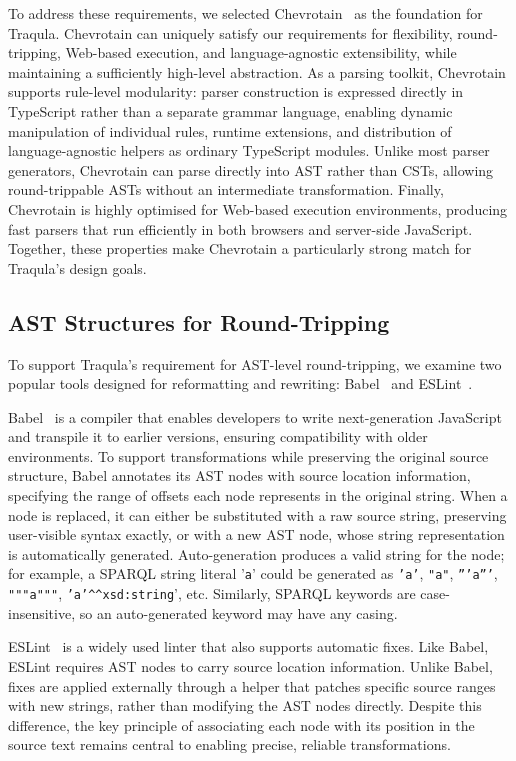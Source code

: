 \documentclass[runningheads]{llncs}
\begin{document}
    To address these requirements, we selected Chevrotain~\cite{chevrotain} as the foundation for Traqula.
    Chevrotain can uniquely satisfy our requirements for flexibility, round-tripping, Web-based execution, and language-agnostic extensibility,
    while maintaining a sufficiently high-level abstraction.
    As a parsing toolkit, Chevrotain supports rule-level modularity:
    parser construction is expressed directly in TypeScript rather than a separate grammar language, enabling dynamic manipulation of individual rules, runtime extensions,
    and distribution of language-agnostic helpers as ordinary TypeScript modules.
    Unlike most parser generators, Chevrotain can parse directly into AST rather than CSTs,
    allowing round-trippable ASTs without an intermediate transformation.
    Finally, Chevrotain is highly optimised for Web-based execution environments,
    producing fast parsers that run efficiently in both browsers and server-side JavaScript.
    Together, these properties make Chevrotain a particularly strong match for Traqula's design goals.

    \subsection{AST Structures for Round-Tripping}

    To support Traqula's requirement for AST-level round-tripping,
    we examine two popular tools designed for reformatting and rewriting: Babel~\cite{babel} and ESLint~\cite{eslint}.

    Babel~\cite{babel} is a compiler that enables developers to write next-generation JavaScript and transpile it to earlier versions,
    ensuring compatibility with older environments.
    To support transformations while preserving the original source structure,
    Babel annotates its AST nodes with source location information,
    specifying the range of offsets each node represents in the original string.
    When a node is replaced, it can either be substituted with a raw source string,
    preserving user-visible syntax exactly, or with a new AST node, whose string representation is automatically generated.
    Auto-generation produces a valid string for the node; for example, a SPARQL string literal '\texttt{a}' could be generated as \texttt{'a'}, \texttt{"a"}, \texttt{'''a'''}, \texttt{"""a"""}, \texttt{'a'\^{}\^{}xsd:string}', etc.
    Similarly, SPARQL keywords are case-insensitive, so an auto-generated keyword may have any casing.

    ESLint~\cite{eslint} is a widely used linter that also supports automatic fixes.
    Like Babel, ESLint requires AST nodes to carry source location information.
    Unlike Babel, fixes are applied externally through a helper that patches specific source ranges with new strings, rather than modifying the AST nodes directly.
    Despite this difference, the key principle of associating each node with its position in the source text remains central to enabling precise, reliable transformations.
\end{document}

